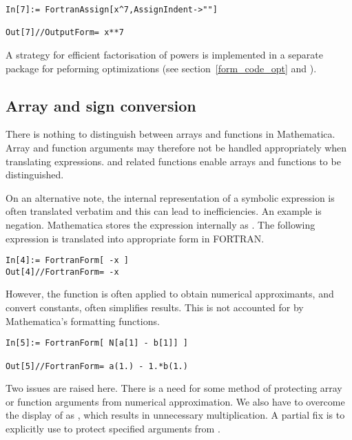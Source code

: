 \documentclass [12pt,twoside]{article}
\begin{document}
\begin{verbatim}
In[7]:= FortranAssign[x^7,AssignIndent->""]

Out[7]//OutputForm= x**7
\end{verbatim}
A strategy for efficient factorisation of powers is implemented in a separate
package for peforming optimizations (see section~\ref{form_code_opt} and \cite{me93c}).

\pagebreak[2]

\subsection{Array and sign conversion}

There is nothing to distinguish between arrays and functions in Mathematica.
Array and function arguments may therefore not be handled appropriately
when translating expressions.  and related functions enable
arrays and functions to be distinguished.

On an alternative note, the internal representation of a symbolic
expression is often translated verbatim and this can lead to inefficiencies. An
example is negation. Mathematica stores the expression  internally as
. The following expression is translated into appropriate form in FORTRAN.
\begin{verbatim}
In[4]:= FortranForm[ -x ]
Out[4]//FortranForm= -x
\end{verbatim}
However, the function  is often applied to obtain numerical approximants,
and convert constants, often simplifies results. This is not accounted for by
Mathematica's formatting functions.

\begin{verbatim}
In[5]:= FortranForm[ N[a[1] - b[1]] ]

Out[5]//FortranForm= a(1.) - 1.*b(1.)
\end{verbatim}
Two issues are raised here. There is a need for some method of protecting
array or function arguments from numerical approximation. We also have to
overcome the display of  as , which results in unnecessary
multiplication. A partial fix is to explicitly use  to protect
specified arguments from .
\end{document}
